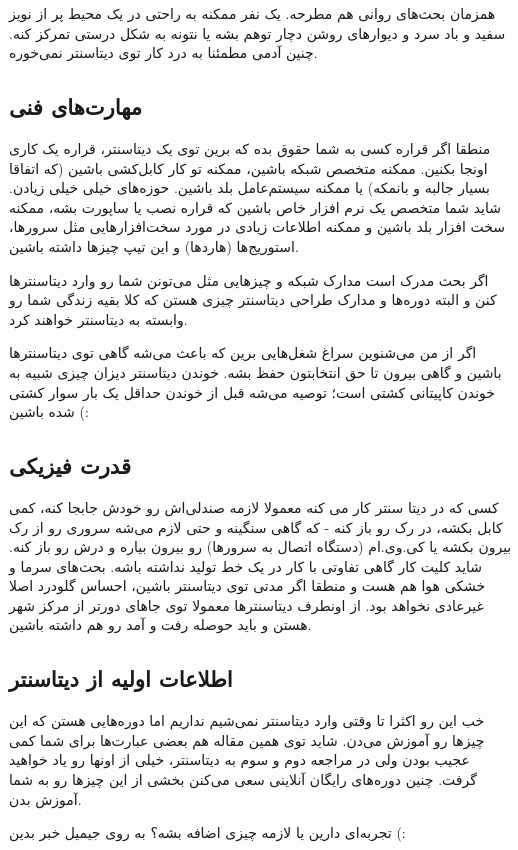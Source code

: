 همزمان بحث‌های روانی هم مطرحه. یک نفر ممکنه به راحتی در یک محیط پر از نویز سفید و باد سرد و دیوارهای روشن دچار توهم بشه یا نتونه به شکل درستی تمرکز کنه. چنین آدمی مطمئنا به درد کار توی دیتاسنتر نمی‌خوره.
\subsection*{مهارت‌های فنی}
منطقا اگر قراره کسی به شما حقوق بده که برین توی یک دیتاسنتر، قراره یک کاری اونجا بکنین. ممکنه متخصص شبکه‌ باشین، ممکنه تو کار کابل‌کشی باشین (که اتفاقا بسیار جالبه و بانمکه) یا ممکنه سیستم‌عامل بلد باشین. حوزه‌های خیلی خیلی زیادن. شاید شما متخصص یک نرم افزار خاص باشین که قراره نصب یا ساپورت بشه، ممکنه سخت افزار بلد باشین و ممکنه اطلاعات زیادی در مورد سخت‌افزارهایی مثل سرورها، استوریج‌ها (هاردها) و این تیپ چیزها داشته باشین.

اگر بحث مدرک است مدارک شبکه و چیزهایی مثل  می‌تونن شما رو وارد دیتاسنترها کنن و البته دوره‌ها و مدارک طراحی دیتاسنتر چیزی هستن که کلا بقیه زندگی شما رو وابسته به دیتاسنتر خواهند کرد.

اگر از من می‌شنوین سراغ شغل‌هایی برین که باعث می‌شه گاهی توی دیتاسنترها باشین و گاهی بیرون تا حق انتخابتون حفظ بشه. خوندن دیتاسنتر دیزان چیزی شبیه به خوندن کاپیتانی کشتی است؛ توصیه می‌شه قبل از خوندن حداقل یک بار سوار کشتی شده باشین (:

\subsection*{قدرت فیزیکی}
کسی که در دیتا سنتر کار می کنه معمولا لازمه صندلی‌اش رو خودش جابجا کنه، کمی کابل بکشه، در رک رو باز کنه - که گاهی سنگینه و حتی لازم می‌شه سروری رو از رک بیرون بکشه یا کی.وی.ام (دستگاه اتصال به سرورها) رو بیرون بیاره و درش رو باز کنه. شاید کلیت کار گاهی تفاوتی با کار در یک خط تولید نداشته باشه. بحث‌های سرما و خشکی هوا هم هست و منطقا اگر مدتی توی دیتاسنتر باشین، احساس گلودرد اصلا غیرعادی نخواهد بود. از اونطرف دیتاسنترها معمولا توی جاهای دورتر از مرکز شهر هستن و باید حوصله رفت و آمد رو هم داشته باشین.
\subsection*{اطلاعات اولیه از دیتاسنتر}
خب این رو اکثرا تا وقتی وارد دیتاسنتر نمی‌شیم نداریم اما دوره‌هایی هستن که این چیزها رو آموزش می‌دن. شاید توی همین مقاله هم بعضی عبارت‌ها برای شما کمی عجیب بودن ولی در مراجعه دوم و سوم به دیتاسنتر، خیلی از اونها رو یاد خواهید گرفت. چنین دوره‌های رایگان آنلاینی  سعی می‌کنن بخشی از این چیزها رو به شما آموزش بدن.

تجربه‌ای دارین یا لازمه چیزی اضافه بشه؟ به  روی جیمیل خبر بدین (:
